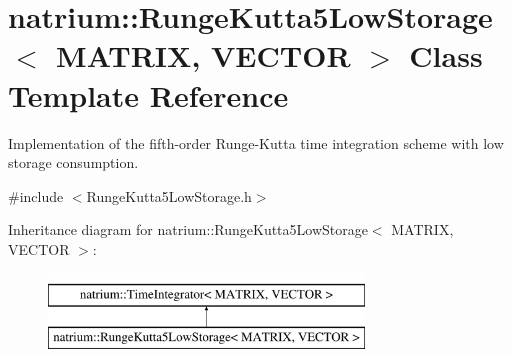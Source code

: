 \hypertarget{classnatrium_1_1RungeKutta5LowStorage}{\section{natrium\-:\-:Runge\-Kutta5\-Low\-Storage$<$ M\-A\-T\-R\-I\-X, V\-E\-C\-T\-O\-R $>$ Class Template Reference}
\label{classnatrium_1_1RungeKutta5LowStorage}
}


Implementation of the fifth-\/order Runge-\/\-Kutta time integration scheme with low storage consumption.  




{\ttfamily \#include $<$Runge\-Kutta5\-Low\-Storage.\-h$>$}

Inheritance diagram for natrium\-:\-:Runge\-Kutta5\-Low\-Storage$<$ M\-A\-T\-R\-I\-X, V\-E\-C\-T\-O\-R $>$\-:\begin{figure}[H]
\begin{center}
\leavevmode
\includegraphics[height=2.000000cm]{classnatrium_1_1RungeKutta5LowStorage}
\end{center}
\end{figure}
